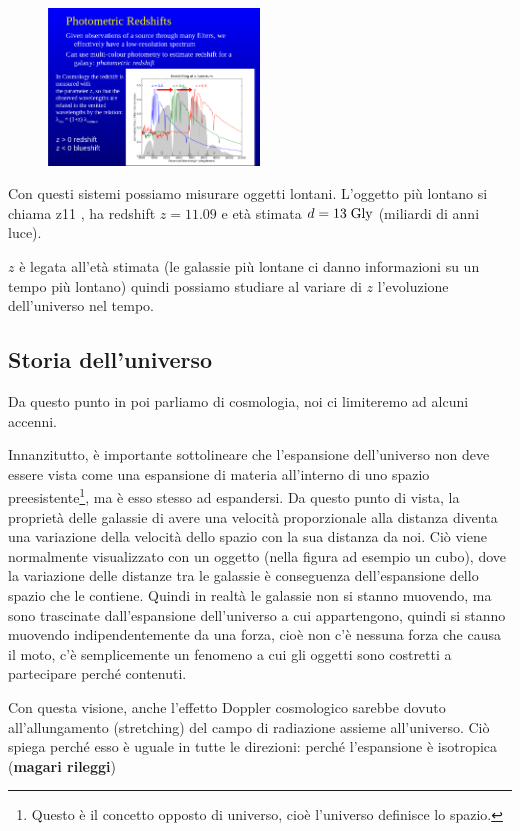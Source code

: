\begin{figure}[H]
    \centering
    \includegraphics[width=0.5\textwidth]{immagini16dic/photoredshift.png}
\end{figure}

Con questi sistemi possiamo misurare oggetti lontani. L'oggetto più lontano si chiama z11 , ha redshift $z=11.09$ e età stimata $d=13 \; \rm Gly$ (miliardi di anni luce).

$z$ è legata all'età stimata (le galassie più lontane ci danno informazioni su un tempo più lontano) quindi possiamo studiare al variare di $z$ l'evoluzione dell'universo nel tempo.

\subsection{Storia dell'universo}
Da questo punto in poi parliamo di cosmologia, noi ci limiteremo ad alcuni accenni.

Innanzitutto, è importante sottolineare che l'espansione dell'universo non deve essere vista come una espansione di materia all'interno di uno spazio preesistente\footnote{Questo è il concetto opposto di universo, cioè l'universo definisce lo spazio.}, ma è esso stesso ad espandersi. Da questo punto di vista, la proprietà delle galassie di avere una velocità proporzionale alla distanza diventa una variazione della velocità dello spazio con la sua distanza da noi. Ciò viene normalmente visualizzato con un oggetto (nella figura ad esempio un cubo), dove la variazione delle distanze tra le galassie è conseguenza dell'espansione dello spazio che le contiene. Quindi in realtà le galassie non si stanno muovendo, ma sono trascinate dall'espansione dell'universo a cui appartengono, quindi si stanno muovendo indipendentemente da una forza, cioè non c'è nessuna forza che causa il moto, c'è semplicemente un fenomeno a cui gli oggetti sono costretti a partecipare perché contenuti.

Con questa visione, anche l'effetto Doppler cosmologico sarebbe dovuto all'allungamento (stretching) del campo di radiazione assieme all'universo. Ciò spiega perché esso è uguale in tutte le direzioni: perché l'espansione è isotropica (\textbf{magari rileggi})

